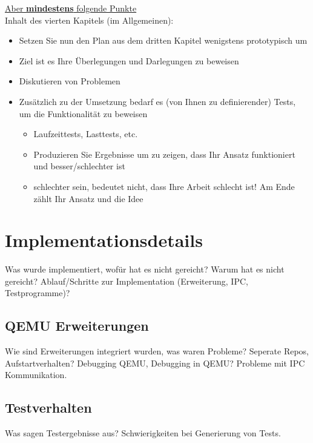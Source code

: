 \underline{Aber \textbf{mindestens} folgende Punkte}\\
Inhalt des vierten Kapitels (im Allgemeinen):
\begin{itemize}
    \item Setzen Sie nun den Plan aus dem dritten Kapitel wenigstens prototypisch um
    \item Ziel ist es Ihre Überlegungen und Darlegungen zu beweisen
    \item Diskutieren von Problemen
    \item Zusätzlich zu der Umsetzung bedarf es (von Ihnen zu definierender) Tests, um die Funktionalität zu beweisen
    \begin{itemize}
        \item Laufzeittests, Lasttests, etc.
        \item Produzieren Sie Ergebnisse um zu zeigen, dass Ihr Ansatz funktioniert und besser/schlechter ist
        \item \glqq schlechter\grqq{} sein, bedeutet nicht, dass Ihre Arbeit schlecht ist! Am Ende zählt Ihr Ansatz und die Idee
    \end{itemize}
\end{itemize}
\fi

\section{Implementationsdetails}
Was wurde implementiert, wofür hat es nicht gereicht?
Warum hat es nicht gereicht?
Ablauf/Schritte zur Implementation (Erweiterung, IPC, Testprogramme)?

\subsection{QEMU Erweiterungen}
Wie sind Erweiterungen integriert wurden, was waren Probleme?
Seperate Repos, Aufstartverhalten?
Debugging QEMU, Debugging in QEMU?
Probleme mit IPC Kommunikation.

\subsection{Testverhalten}
Was sagen Testergebnisse aus?
Schwierigkeiten bei Generierung von Tests.
